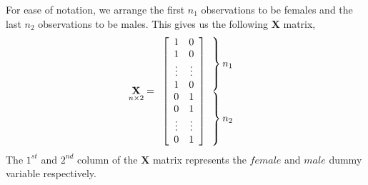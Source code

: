 \documentclass[12pt]{report}
\begin{document}
\noindent For ease of notation, we arrange the first $n_1$ observations to be females and the last $n_2$ observations to be males. This gives us the following \textbf{X} matrix,
\begin{equation*}
\underset{n\times2}{\textbf{X}} = \begin{array}{c@{\!\!\!}l}
\left[ \begin{array}[c]{ccccc}
1 & 0 \\
1 & 0 \\
\vdots & \vdots \\
1 & 0 \\
0 & 1 \\
0 & 1 \\
\vdots & \vdots \\
0 & 1 \\
\end{array}  \right]
&
\begin{array}[c]{@{}l@{\,}l}
\left. \begin{array}{c} \vphantom{0} \\ \vphantom{0} \\\vphantom{\vdots}\\ \vphantom{0} \end{array} \right\} & \text{$n_1$} \\
\left. \begin{array}{c} \vphantom{1} \\ \vphantom{1} \\ \vphantom{\vdots}
\\ \vphantom{1}  \end{array} \right\} & \text{$n_2$} \\
\end{array}
\end{array}
\end{equation*}
\noindent The $1^{st}$ and $2^{nd}$ column of the \textbf{X} matrix represents the $female$ and $male$ dummy variable respectively.
\end{document}
